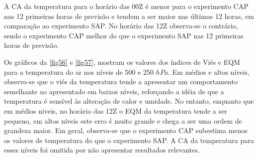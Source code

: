A CA da temperatura para o horário das 00Z é menor para o experimento CAP nas 12 primeiras horas de previsão e tendem a ser maior nas últimas 12 horas, em comparação ao experimento SAP. No horário das 12Z observa-se o contrário, sendo o experimento CAP melhor do que o experimento SAP nas 12 primeiras horas de previsão.

Os gráficos da \autoref{fig56} e \autoref{fig57}, mostram os valores dos índices de Viés e EQM para a temperatura do ar nos níveis de 500 e 250 $hPa$. Em médios e altos níveis, observa-se que o viés da temperatura tende a apresentar um comportamento semelhante ao apresentado em baixos níveis, reforçando a idéia de que a temperatura é sensível às alteração de calor e umidade. No entanto, enquanto que em médios níveis, no horário das 12Z o EQM da temperatura tende a ser pequeno, em altos níveis este erro é muito grande e chega a ser uma ordem de grandeza maior. Em geral, observa-se que o experimento CAP subestima menos os valores de temperatura do que o experimento SAP. A CA da temperatura para esses níveis foi omitida por não apresentar resultados relevantes.
     

